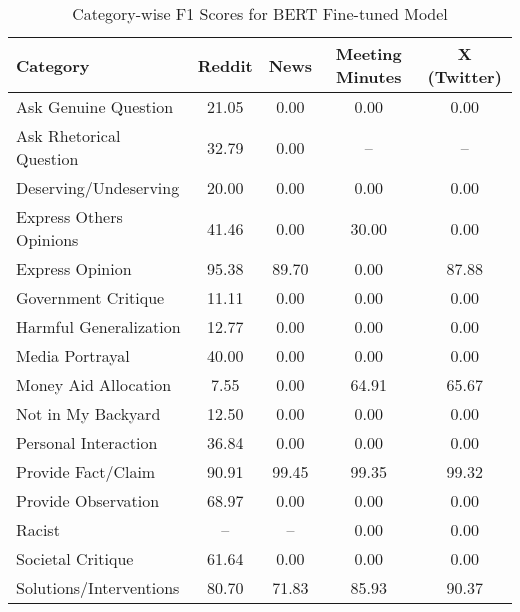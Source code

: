 \begin{table*}[htbp]
\centering
\begin{tabular}{l *{4}{c}}
\toprule
Category & Reddit & News & Meeting Minutes & X (Twitter) \\
\midrule
Ask Genuine Question & 21.05 & 0.00 & 0.00 & 0.00 \\
Ask Rhetorical Question & 32.79 & 0.00 & -- & -- \\
Deserving/Undeserving & 20.00 & 0.00 & 0.00 & 0.00 \\
Express Others Opinions & 41.46 & 0.00 & 30.00 & 0.00 \\
Express Opinion & 95.38 & 89.70 & 0.00 & 87.88 \\
Government Critique & 11.11 & 0.00 & 0.00 & 0.00 \\
Harmful Generalization & 12.77 & 0.00 & 0.00 & 0.00 \\
Media Portrayal & 40.00 & 0.00 & 0.00 & 0.00 \\
Money Aid Allocation & 7.55 & 0.00 & 64.91 & 65.67 \\
Not in My Backyard & 12.50 & 0.00 & 0.00 & 0.00 \\
Personal Interaction & 36.84 & 0.00 & 0.00 & 0.00 \\
Provide Fact/Claim & 90.91 & 99.45 & 99.35 & 99.32 \\
Provide Observation & 68.97 & 0.00 & 0.00 & 0.00 \\
Racist & -- & -- & 0.00 & 0.00 \\
Societal Critique & 61.64 & 0.00 & 0.00 & 0.00 \\
Solutions/Interventions & 80.70 & 71.83 & 85.93 & 90.37 \\
\bottomrule
\end{tabular}
\caption{Category-wise F1 Scores for BERT Fine-tuned Model}
\label{tab:bert_category_breakdown}
\end{table*}